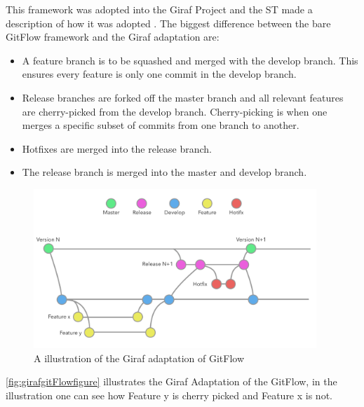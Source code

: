 This framework was adopted into the Giraf Project and the \gls{ST} made a description of how it was adopted \cite{ProcessGitFlow}. The biggest difference between the bare GitFlow framework and the Giraf adaptation are:

\begin{itemize}
    \item A feature branch is to be squashed and merged with the develop branch. This ensures every feature is only one commit in the develop branch.
    \item Release branches are forked off the master branch and all relevant features are cherry-picked from the develop branch. Cherry-picking is when one merges a specific subset of commits from one branch to another.
    \item Hotfixes are merged into the release branch.
    \item The release branch is merged into the master and develop branch.
\end{itemize}
\begin{figure}[H]
        \begin{center}
            \includegraphics[width=0.95\textwidth]{figures/giraf_gitflow_illustration.pdf}
        \end{center}
        \caption{A illustration of the Giraf adaptation of GitFlow}
        \label{fig:girafgitFlowfigure}
\end{figure}
\autoref{fig:girafgitFlowfigure} illustrates the Giraf Adaptation of the GitFlow, in the illustration one can see how Feature y is cherry picked and Feature x is not.



